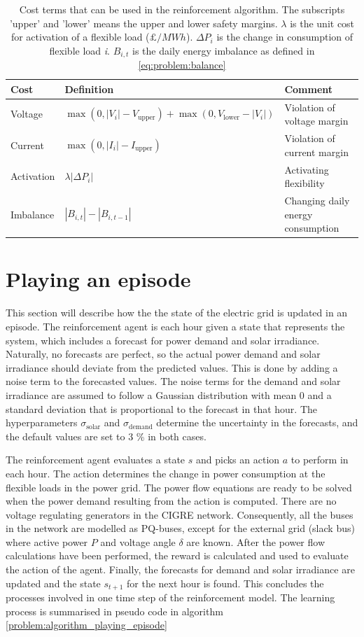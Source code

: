 \documentclass[class=book, crop=false, 11pt]{standalone}
\begin{document}
\begin{table}[ht]
\centering
\caption{Cost terms that can be used in the reinforcement algorithm. The subscripts 'upper' and 'lower' means the upper and lower safety margins. $\lambda$ is the unit cost for activation of a flexible load ($\pounds/MWh$). $\Delta P_{i}$ is the change in consumption of flexible load \textit{i}. $B_{i,t}$ is the daily energy imbalance as defined in \eqref{eq:problem:balance}}
\label{table:reward_terms}
\begin{tabular}{l|ll}

Cost  & Definition & Comment
\\ 
\hline
Voltage &
$\max(0,|V_{i}| - V_{\textrm{upper}}) + \max(0,V_{\textrm{lower}}- |V_{i}|)$ &
Violation of voltage margin
\\
Current &
$\max(0,|I_{i}| - I_{\textrm{upper}})$&
Violation of current margin
\\
Activation &
$\lambda |\Delta P_{i}|$&
Activating flexibility
\\
Imbalance &
$|B_{i,t}|- |B_{i,t-1}|$&
\makecell[l]{Changing daily energy \\consumption}
\\
\hline
\end{tabular}
\end{table}

\section{Playing an episode}
This section will describe how the the state of the electric grid is updated in an episode. The reinforcement agent is each hour given a state that represents the system, which includes a forecast for power demand and solar irradiance. Naturally, no forecasts are perfect, so the actual power demand and solar irradiance should deviate from the predicted values. This is done by adding a noise term to the forecasted values. The noise terms for the demand and solar irradiance are assumed to follow a Gaussian distribution with mean 0 and a standard deviation that is proportional to the forecast in that hour. The hyperparameters $\sigma_{\textrm{solar}}$ and $\sigma_{\textrm{demand}}$ determine the uncertainty in the forecasts, and the default values are set to 3 \% in both cases.

The reinforcement agent evaluates a state $s$ and picks an action $a$ to perform in each hour. The action determines the change in power consumption at the flexible loads in the power grid. The power flow equations are ready to be solved when the power demand resulting from the action is computed. There are no voltage regulating generators in the CIGRE network. Consequently, all the buses in the network are modelled as PQ-buses, except for the external grid (slack bus) where active power $P$ and voltage angle $\delta$ are known. After the power flow calculations have been performed, the reward is calculated and used to evaluate the action of the agent. Finally, the forecasts for demand and solar irradiance are updated and the state $s_{t+1}$ for the next hour is found. This concludes the processes involved in one time step of the reinforcement model. The learning process is summarised in pseudo code in algorithm \ref{problem:algorithm_playing_episode} 
\end{document}
